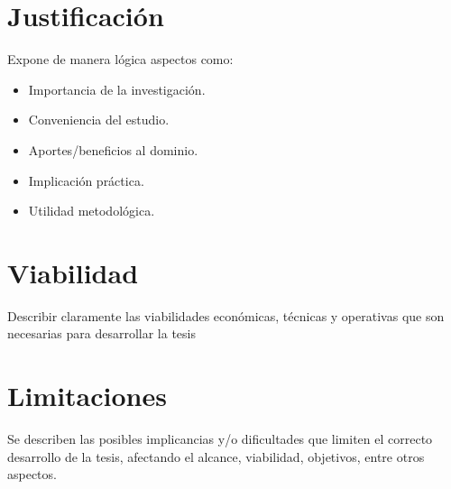 \section{Justificación}
Expone de manera lógica aspectos como:
\begin{itemize}
    \item Importancia de la investigación.
    \item Conveniencia del estudio.
    \item Aportes/beneficios al dominio.
    \item Implicación práctica.
    \item Utilidad metodológica.
\end{itemize} 

\section{Viabilidad}
Describir claramente las viabilidades económicas, técnicas y operativas que son necesarias para desarrollar la tesis

\section{Limitaciones}
Se describen las posibles implicancias y/o dificultades que limiten el correcto desarrollo de la tesis, afectando el alcance, viabilidad, objetivos, entre otros aspectos.
